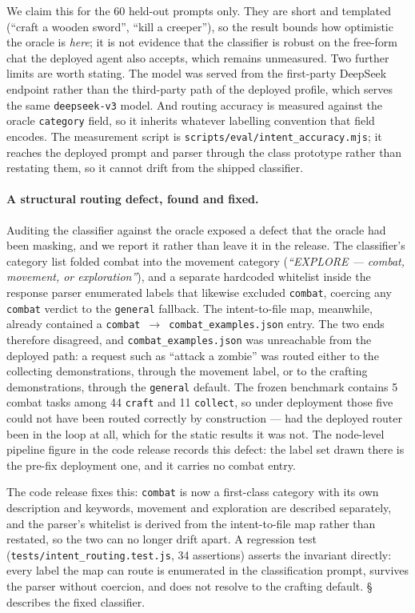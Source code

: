\documentclass[letterpaper]{article} %
\newcommand{\bodyref}[1]{\getrefnumber{#1}}
\begin{document}
We claim this for the 60 held-out prompts only.  They are short and
templated (``craft a wooden sword'', ``kill a creeper''), so the result
bounds how optimistic the oracle is \emph{here}; it is not evidence that
the classifier is robust on the free-form chat the deployed agent also
accepts, which remains unmeasured.  Two further limits are worth
stating.  The model was served from the first-party DeepSeek endpoint
rather than the third-party path of the deployed profile, which serves
the same \texttt{deepseek-v3} model.  And routing accuracy is measured
against the oracle \texttt{category} field, so it inherits whatever
labelling convention that field encodes.  The measurement script is
\texttt{scripts/eval/intent\_accuracy.mjs}; it reaches the deployed
prompt and parser through the class prototype rather than restating
them, so it cannot drift from the shipped classifier.

\paragraph{A structural routing defect, found and fixed.}  Auditing the
classifier against the oracle exposed a defect that the oracle had been
masking, and we report it rather than leave it in the release.  The
classifier's category list folded combat into the movement category
(\emph{``EXPLORE --- combat, movement, or exploration''}), and a
separate hardcoded whitelist inside the response parser enumerated
labels that likewise excluded \texttt{combat}, coercing any
\texttt{combat} verdict to the \texttt{general} fallback.  The
intent-to-file map, meanwhile, already contained a
\texttt{combat}~$\rightarrow$~\texttt{combat\_examples.json} entry.  The
two ends therefore disagreed, and \texttt{combat\_examples.json} was
unreachable from the deployed path: a request such as ``attack a
zombie'' was routed either to the collecting demonstrations, through the
movement label, or to the crafting demonstrations, through the
\texttt{general} default.  The frozen benchmark contains 5 combat tasks
among 44 \texttt{craft} and 11 \texttt{collect}, so under deployment
those five could not have been routed correctly by construction --- had
the deployed router been in the loop at all, which for the static
results it was not.  The node-level pipeline figure in the code release
records this defect: the label set drawn there is the pre-fix deployment one,
and it carries no combat entry.

The code release fixes this: \texttt{combat} is now a first-class
category with its own description and keywords, movement and exploration
are described separately, and the parser's whitelist is derived from the
intent-to-file map rather than restated, so the two can no longer drift
apart.  A regression test (\texttt{tests/intent\_routing.test.js}, 34
assertions) asserts the invariant directly: every label the map can
route is enumerated in the classification prompt, survives the parser
without coercion, and does not resolve to the crafting default.
\S\bodyref{sec:catfilter} describes the fixed classifier.
\end{document}

